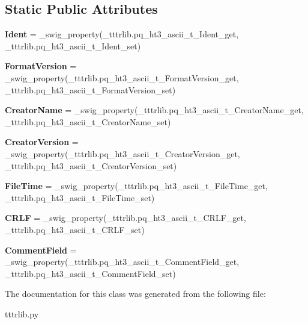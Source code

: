 \subsection*{Static Public Attributes}
\begin{DoxyCompactItemize}
\item 
\mbox{\label{classtttrlib_1_1pq__ht3__ascii__t_a26e08e4faddeaf73286bdef5f47def94}} 
{\bfseries Ident} = \+\_\+swig\+\_\+property(\+\_\+tttrlib.\+pq\+\_\+ht3\+\_\+ascii\+\_\+t\+\_\+\+Ident\+\_\+get, \+\_\+tttrlib.\+pq\+\_\+ht3\+\_\+ascii\+\_\+t\+\_\+\+Ident\+\_\+set)
\item 
\mbox{\label{classtttrlib_1_1pq__ht3__ascii__t_a739b9e63802a859cce5d58b0496659cc}} 
{\bfseries Format\+Version} = \+\_\+swig\+\_\+property(\+\_\+tttrlib.\+pq\+\_\+ht3\+\_\+ascii\+\_\+t\+\_\+\+Format\+Version\+\_\+get, \+\_\+tttrlib.\+pq\+\_\+ht3\+\_\+ascii\+\_\+t\+\_\+\+Format\+Version\+\_\+set)
\item 
\mbox{\label{classtttrlib_1_1pq__ht3__ascii__t_acbcf3ffd07a15e4aca0627333997ea33}} 
{\bfseries Creator\+Name} = \+\_\+swig\+\_\+property(\+\_\+tttrlib.\+pq\+\_\+ht3\+\_\+ascii\+\_\+t\+\_\+\+Creator\+Name\+\_\+get, \+\_\+tttrlib.\+pq\+\_\+ht3\+\_\+ascii\+\_\+t\+\_\+\+Creator\+Name\+\_\+set)
\item 
\mbox{\label{classtttrlib_1_1pq__ht3__ascii__t_a9a95a157c48a5341bf2b05c1f42d05f1}} 
{\bfseries Creator\+Version} = \+\_\+swig\+\_\+property(\+\_\+tttrlib.\+pq\+\_\+ht3\+\_\+ascii\+\_\+t\+\_\+\+Creator\+Version\+\_\+get, \+\_\+tttrlib.\+pq\+\_\+ht3\+\_\+ascii\+\_\+t\+\_\+\+Creator\+Version\+\_\+set)
\item 
\mbox{\label{classtttrlib_1_1pq__ht3__ascii__t_ab3039cc562d3af1c53b2edd4ebc7abf6}} 
{\bfseries File\+Time} = \+\_\+swig\+\_\+property(\+\_\+tttrlib.\+pq\+\_\+ht3\+\_\+ascii\+\_\+t\+\_\+\+File\+Time\+\_\+get, \+\_\+tttrlib.\+pq\+\_\+ht3\+\_\+ascii\+\_\+t\+\_\+\+File\+Time\+\_\+set)
\item 
\mbox{\label{classtttrlib_1_1pq__ht3__ascii__t_af708451f878802564903f2d9a7f5c402}} 
{\bfseries C\+R\+LF} = \+\_\+swig\+\_\+property(\+\_\+tttrlib.\+pq\+\_\+ht3\+\_\+ascii\+\_\+t\+\_\+\+C\+R\+L\+F\+\_\+get, \+\_\+tttrlib.\+pq\+\_\+ht3\+\_\+ascii\+\_\+t\+\_\+\+C\+R\+L\+F\+\_\+set)
\item 
\mbox{\label{classtttrlib_1_1pq__ht3__ascii__t_a1dff97afcd0a2325b083efa1877c5add}} 
{\bfseries Comment\+Field} = \+\_\+swig\+\_\+property(\+\_\+tttrlib.\+pq\+\_\+ht3\+\_\+ascii\+\_\+t\+\_\+\+Comment\+Field\+\_\+get, \+\_\+tttrlib.\+pq\+\_\+ht3\+\_\+ascii\+\_\+t\+\_\+\+Comment\+Field\+\_\+set)
\end{DoxyCompactItemize}


The documentation for this class was generated from the following file\+:\begin{DoxyCompactItemize}
\item 
tttrlib.\+py\end{DoxyCompactItemize}
